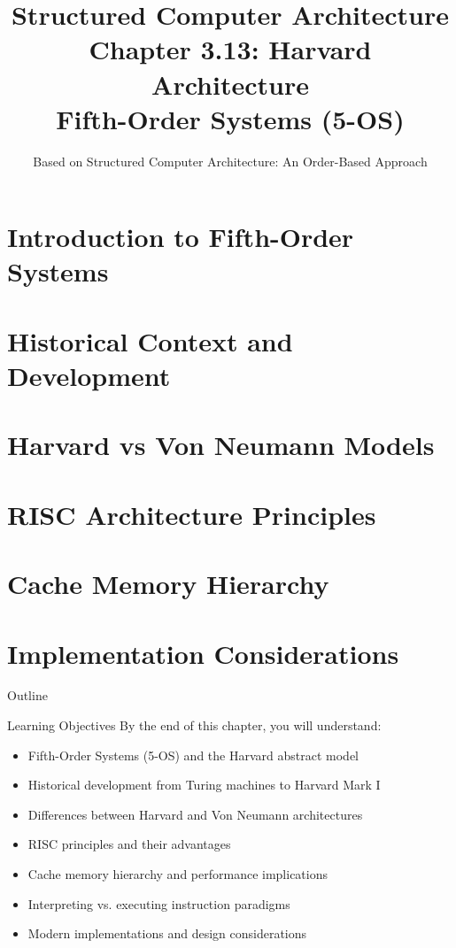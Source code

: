 \documentclass[aspectratio=169]{beamer}
\title[Chapter 3.13: Harvard Architecture]{Structured Computer Architecture\\Chapter 3.13: Harvard Architecture\\Fifth-Order Systems (5-OS)}
\author{Based on Structured Computer Architecture: An Order-Based Approach}
\date{}
\begin{document}
\begin{frame}
\titlepage
\end{frame}

\setcounter{section}{0}

\section{Introduction to Fifth-Order Systems}
\section{Historical Context and Development}
\section{Harvard vs Von Neumann Models}
\section{RISC Architecture Principles}
\section{Cache Memory Hierarchy}
\section{Implementation Considerations}

\begin{frame}{Outline}
\tableofcontents
\end{frame}

\begin{frame}{Learning Objectives}
By the end of this chapter, you will understand:
\begin{itemize}
\item Fifth-Order Systems (5-OS) and the Harvard abstract model
\item Historical development from Turing machines to Harvard Mark I
\item Differences between Harvard and Von Neumann architectures
\item RISC principles and their advantages
\item Cache memory hierarchy and performance implications
\item Interpreting vs. executing instruction paradigms
\item Modern implementations and design considerations
\end{itemize}
\end{frame}
\end{document}
